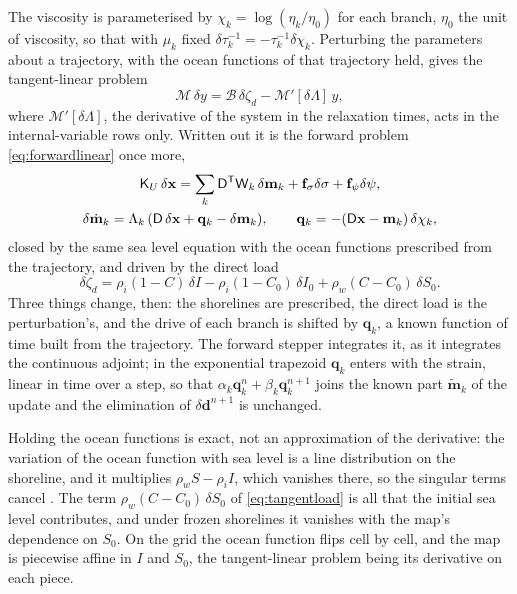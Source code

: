 \documentclass[11pt,a4paper]{article}
\numberwithin{equation}{section}
\begin{document}
The viscosity is parameterised by $\chi_{k} = \log(\eta_{k}/\eta_{0})$ for each
branch, $\eta_{0}$ the unit of viscosity, so that with $\mu_{k}$ fixed
$\delta\tau_{k}^{-1} = -\tau_{k}^{-1}\delta\chi_{k}$. Perturbing the parameters
about a trajectory, with the ocean functions of that trajectory held, gives the
tangent-linear problem
\begin{equation}
\mathcal{M}\,\delta y = \mathcal{B}\,\delta\zeta_{d} - \mathcal{M}'[\delta\Lambda]\,y,
\label{eq:tangent}
\end{equation}
where $\mathcal{M}'[\delta\Lambda]$, the derivative of the system in the
relaxation times, acts in the internal-variable rows only. Written out it is
the forward problem \eqref{eq:forwardlinear} once more,
\begin{gather}
\mathsf{K}_{U}\,\delta\mathbf{x} = \sum_{k}\mathsf{D}^{\mathsf T}\mathsf{W}_{k}\,\delta\mathbf{m}_{k}
 + \mathbf{f}_{\sigma}\delta\sigma + \mathbf{f}_{\psi}\delta\psi,\notag\\
\delta\dot{\mathbf{m}}_{k} = \Lambda_{k}\,(\mathsf{D}\,\delta\mathbf{x} + \mathbf{q}_{k} - \delta\mathbf{m}_{k}),\qquad
\mathbf{q}_{k} = -(\mathsf{D}\mathbf{x}-\mathbf{m}_{k})\,\delta\chi_{k},
\label{eq:tangentvisco}
\end{gather}
closed by the same sea level equation with the ocean functions prescribed from
the trajectory, and driven by the direct load
\begin{equation}
\delta\zeta_{d} = \rho_{i}(1-C)\,\delta I - \rho_{i}(1-C_{0})\,\delta I_{0}
 + \rho_{w}(C-C_{0})\,\delta S_{0}.
\label{eq:tangentload}
\end{equation}
Three things change, then: the shorelines are prescribed, the direct load is
the perturbation's, and the drive of each branch is shifted by $\mathbf{q}_{k}$,
a known function of time built from the trajectory. The forward stepper
integrates it, as it integrates the continuous adjoint; in the exponential
trapezoid $\mathbf{q}_{k}$ enters with the strain, linear in time over a step,
so that $\alpha_{k}\mathbf{q}_{k}^{n}+\beta_{k}\mathbf{q}_{k}^{n+1}$ joins the
known part $\tilde{\mathbf{m}}_{k}$ of the update and the elimination of
$\delta\mathbf{d}^{n+1}$ is unchanged.

Holding the ocean functions is exact, not an approximation of the derivative:
the variation of the ocean function with sea level is a line distribution on
the shoreline, and it multiplies $\rho_{w}S-\rho_{i}I$, which vanishes there, so
the singular terms cancel \citep[eqs 51--53 and 62--63]{YuEtAl2025}. The term
$\rho_{w}(C-C_{0})\,\delta S_{0}$ of \eqref{eq:tangentload} is all that the
initial sea level contributes, and under frozen shorelines it vanishes with
the map's dependence on $S_{0}$. On the grid the ocean function flips cell by
cell, and the map is piecewise affine in $I$ and $S_{0}$, the tangent-linear
problem being its derivative on each piece.
\end{document}
